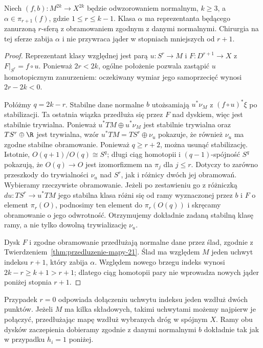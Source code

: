 \begin{lemat}
\label{lem:ramy-ponizej-srodka-Wall-22}
Niech $(f,b):M^{2k}\to X^{2k}$ będzie
odwzorowaniem normalnym, $k\geq3$, a
$\alpha\in\pi_{r+1}(f)$, gdzie $1\leq r\leq k-1$.
Klasa $\alpha$ ma reprezentanta będącego
zanurzoną $r$-sferą z obramowaniem zgodnym
z danymi normalnymi. Chirurgia na tej sferze
zabija $\alpha$ i nie przywraca jąder
w stopniach mniejszych od $r+1$.
\end{lemat}
\begin{proof}
Reprezentant klasy względnej jest parą
$u:S^r\to M$ i $F:D^{r+1}\to X$ z
$F|_{S^r}=f\circ u$. Ponieważ
$2r<2k$, ogólne położenie pozwala
zastąpić $u$ homotopicznym zanurzeniem:
oczekiwany wymiar jego samoprzecięć
wynosi $2r-2k<0$.

Połóżmy $q=2k-r$. Stabilne dane normalne
$b$ utożsamiają $u^*\nu_M$ z
$(f\circ u)^*\xi$ po stabilizacji.
Ta ostatnia wiązka przedłuża się przez
$F$ nad dyskiem, więc jest stabilnie
trywialna. Ponieważ
$u^*TM\oplus u^*\nu_M$ jest stabilnie
trywialna oraz $TS^r\oplus\R$
jest trywialna, wzór
$u^*TM=TS^r\oplus\nu_u$ pokazuje,
że również $\nu_u$ ma zgodne stabilne
obramowanie. Ponieważ
$q\geq r+2$, można usunąć stabilizację.
Istotnie, $O(q+1)/O(q)\cong S^q$;
długi ciąg homotopii i $(q-1)$-spójność
$S^q$ pokazują, że $O(q)\to O$
jest izomorfizmem na $\pi_j$ dla
$j\leq r$. Dotyczy to zarówno przeszkody
do trywialności $\nu_u$ nad $S^r$,
jak i różnicy dwóch jej obramowań.
Wybieramy rzeczywiste obramowanie.
Jeżeli po zestawieniu go z różniczką
$du:TS^r\to u^*TM$ jego stabilna klasa
różni się od ramy wyznaczonej przez $b$
i $F$ o element $\pi_r(O)$, podnosimy
ten element do $\pi_r(O(q))$ i skręcamy
obramowanie o jego odwrotność.
Otrzymujemy dokładnie zadaną stabilną
klasę ramy, a nie tylko dowolną
trywializację $\nu_u$.

Dysk $F$ i zgodne obramowanie przedłużają
normalne dane przez ślad, zgodnie z
Twierdzeniem~\ref{thm:przedluzenie-mapy-21}.
Ślad ma względem $M$ jeden uchwyt indeksu
$r+1$, który zabija $\alpha$.
Względem nowego brzegu indeks wynosi
$2k-r\geq k+1>r+1$; dlatego ciąg
homotopii pary nie wprowadza nowych
jąder poniżej stopnia $r+1$.
\end{proof}

Przypadek $r=0$ odpowiada dołączeniu uchwytu
indeksu jeden wzdłuż dwóch punktów. Jeżeli
$M$ ma kilka składowych, takimi uchwytami
możemy najpierw je połączyć, przedłużając
mapę wzdłuż wybranych dróg w spójnym $X$.
Ramy obu dysków zaczepienia dobieramy
zgodnie z danymi normalnymi $b$ dokładnie
tak jak w przypadku $h_i=1$ poniżej.

